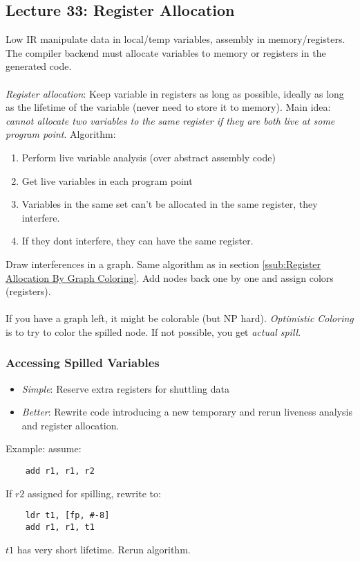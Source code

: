 

\subsection{Lecture 33: Register Allocation} %
\label{sub:Lecture 33: Register Allocation}
Low IR manipulate data in local/temp variables, assembly in memory/registers. The compiler backend must allocate variables to memory or registers in the generated code.\\
\\
\emph{Register allocation}: Keep variable in registers as long as possible, ideally as long as the lifetime of the variable (never need to store it to memory). Main idea: \emph{cannot allocate two variables to the same register if they are both live at some program point}. Algorithm:
\begin{enumerate}
	\item Perform live variable analysis (over abstract assembly code)
	\item Get live variables in each program point
	\item Variables in the same set can't be allocated in the same register, they interfere.
	\item If they dont interfere, they can have the same register.
\end{enumerate}
Draw interferences in a graph. Same algorithm as in section \ref{ssub:Register Allocation By Graph Coloring}. Add nodes back one by one and assign colors (registers). \\
\\
If you have a graph left, it might be colorable (but NP hard). \emph{Optimistic Coloring} is to try to color the spilled node. If not possible, you get \emph{actual spill}.

\subsubsection{Accessing Spilled Variables} %
\label{ssub:Accessing Spilled Variables}
\begin{itemize}
	\item \emph{Simple}: Reserve extra registers for shuttling data
	\item \emph{Better}: Rewrite code introducing a new temporary and rerun liveness analysis and register allocation.
\end{itemize}
Example: assume:
\begin{lstlisting}
	add r1, r1, r2
\end{lstlisting}
If $r2$ assigned for spilling, rewrite to:
\begin{lstlisting}
	ldr t1, [fp, #-8]
	add r1, r1, t1
\end{lstlisting}
$t1$ has very short lifetime. Rerun algorithm.


